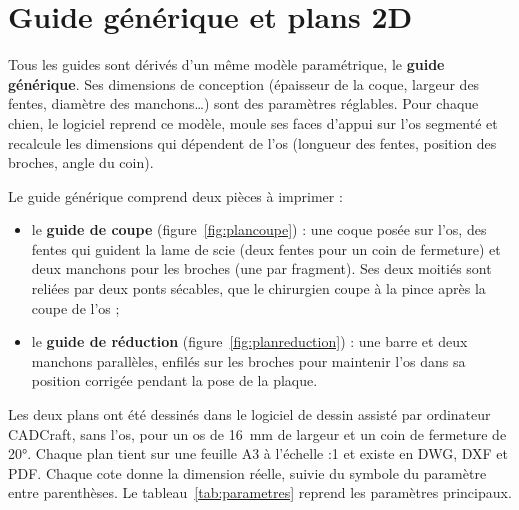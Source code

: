 \documentclass[11pt,a4paper]{article}
\DeclareRobustCommand{\echelle}{{\NoAutoSpacing 2:1}}
\begin{document}
\section{Guide générique et plans 2D}
\label{sec:generique}

Tous les guides sont dérivés d'un même modèle paramétrique, le \textbf{guide générique}. Ses dimensions de conception
(épaisseur de la coque, largeur des fentes, diamètre des manchons\ldots) sont des paramètres réglables. Pour chaque
chien, le logiciel reprend ce modèle, moule ses faces d'appui sur l'os segmenté et recalcule les dimensions qui
dépendent de l'os (longueur des fentes, position des broches, angle du coin).

Le guide générique comprend deux pièces à imprimer :
\begin{itemize}
  \item le \textbf{guide de coupe} (figure~\ref{fig:plancoupe}) : une coque posée sur l'os, des fentes qui guident la
        lame de scie (deux fentes pour un coin de fermeture) et deux manchons pour les broches (une par fragment). Ses deux moitiés
        sont reliées par deux ponts sécables, que le chirurgien coupe à la pince après la coupe de l'os ;
  \item le \textbf{guide de réduction} (figure~\ref{fig:planreduction}) : une barre et deux manchons parallèles,
        enfilés sur les broches pour maintenir l'os dans sa position corrigée pendant la pose de la plaque.
\end{itemize}

Les deux plans ont été dessinés dans le logiciel de dessin assisté par ordinateur CADCraft, sans l'os, pour un os de
16~mm de largeur et un coin de fermeture de 20°. Chaque plan tient sur une feuille A3 à l'échelle \echelle{} et existe en
DWG, DXF et PDF. Chaque cote donne la dimension réelle, suivie du symbole du paramètre entre parenthèses. Le
tableau~\ref{tab:parametres} reprend les paramètres principaux.
\end{document}
